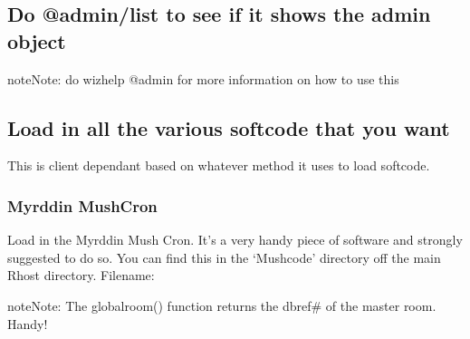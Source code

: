 \documentclass[letterpaper,10pt,english]{sphinxmanual}
\begin{document}
\subsection{Do @admin/list to see if it shows the admin object}
\label{\detokenize{gettingstarted:do-admin-list-to-see-if-it-shows-the-admin-object}}
\begin{sphinxadmonition}{note}{Note:}
\sphinxAtStartPar
do wizhelp @admin for more information on how to use this
\end{sphinxadmonition}

\begin{sphinxVerbatim}[commandchars=\\\{\}]
\end{sphinxVerbatim}


\subsection{Load in all the various softcode that you want}
\label{\detokenize{gettingstarted:load-in-all-the-various-softcode-that-you-want}}
\sphinxAtStartPar
This is client dependant based on whatever method it uses to load softcode.


\subsubsection{Myrddin MushCron}
\label{\detokenize{gettingstarted:myrddin-mushcron}}
\sphinxAtStartPar
Load in the Myrddin Mush Cron.
It’s a very handy piece of software and strongly suggested to do so.  You can find this in the ‘Mushcode’ directory off the main Rhost directory.
Filename:

\begin{sphinxVerbatim}[commandchars=\\\{\}]
\end{sphinxVerbatim}

\begin{sphinxadmonition}{note}{Note:}
\sphinxAtStartPar
The globalroom() function returns the dbref\# of the master room.  Handy!
\end{sphinxadmonition}

\begin{sphinxVerbatim}[commandchars=\\\{\}]
           
 
 
\end{sphinxVerbatim}
\end{document}
